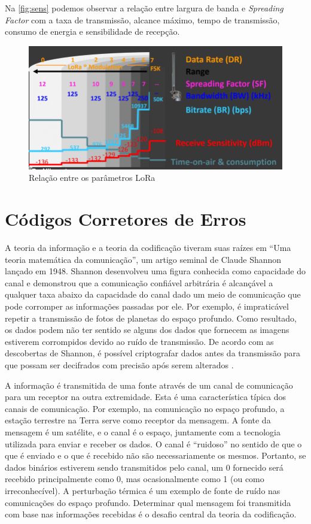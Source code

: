 \documentclass[
	12pt,				%
	openright,			%
	twoside,			%
	a4paper,			%
	english,			%
	french,				%
	spanish,			%
	brazil				%
	]{abntex2}
\newcommand{\quotes}[1]{``#1''}
\begin{document}
Na \autoref{fig:sens} podemos observar a relação entre largura de banda e \emph{Spreading Factor} com a taxa de transmissão, alcance máximo, tempo de transmissão, consumo de energia e sensibilidade de recepção.

\begin{figure}[H]
	\caption{\label{fig:sens}Relação entre os parâmetros LoRa}
	\begin{center}
	    \includegraphics[scale=0.45]{img/Sens.png}
	\end{center}
\end{figure}

\section{Códigos Corretores de Erros}

A teoria da informação e a teoria da codificação tiveram suas raízes em \quotes{Uma teoria matemática da comunicação}, um artigo seminal de Claude Shannon lançado em 1948. Shannon desenvolveu uma figura conhecida como capacidade do canal e demonstrou que a comunicação confiável arbitrária é alcançável a qualquer taxa abaixo da capacidade do canal dado um meio de comunicação que pode corromper as informações passadas por ele. Por exemplo, é impraticável repetir a transmissão de fotos de planetas do espaço profundo. Como resultado, os dados podem não ter sentido se alguns dos dados que fornecem as imagens estiverem corrompidos devido ao ruído de transmissão. De acordo com as descobertas de Shannon, é possível criptografar dados antes da transmissão para que possam ser decifrados com precisão após serem alterados \cite{huffman_2010}.

A informação é transmitida de uma fonte através de um canal de comunicação para um receptor na outra extremidade. Esta é uma característica típica dos canais de comunicação. Por exemplo, na comunicação no espaço profundo, a estação terrestre na Terra serve como receptor da mensagem. A fonte da mensagem é um satélite, e o canal é o espaço, juntamente com a tecnologia utilizada para enviar e receber os dados. O canal é \quotes{ruidoso} no sentido de que o que é enviado e o que é recebido não são necessariamente os mesmos. Portanto, se dados binários estiverem sendo transmitidos pelo canal, um 0 fornecido será recebido principalmente como 0, mas ocasionalmente como 1 (ou como irreconhecível). A perturbação térmica é um exemplo de fonte de ruído nas comunicações do espaço profundo. Determinar qual mensagem foi transmitida com base nas informações recebidas é o desafio central da teoria da codificação.
\end{document}
